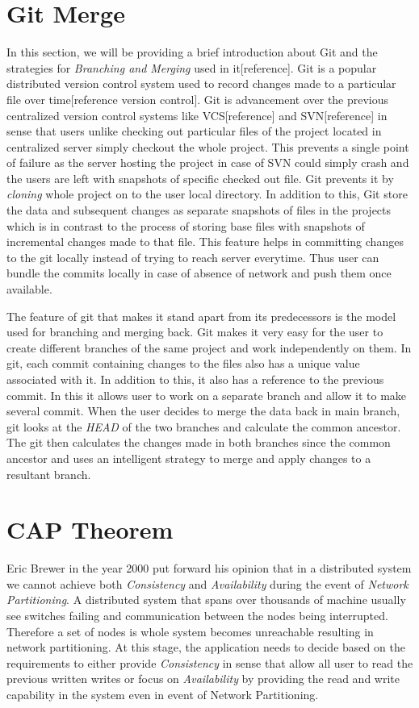 \documentclass[12pt,a4paper,twoside,openright]{book}
\begin{document}
\section{Git Merge}
In this section, we will be providing a brief introduction about Git and the strategies for \textit{Branching and Merging} used in it[reference]. Git is a popular distributed version control system used to record changes made to a particular file over time[reference version control]. Git is advancement over the previous centralized version control systems like VCS[reference] and SVN[reference] in sense that users unlike checking out particular files of the project located in centralized server simply checkout the whole project. This prevents a single point of failure as the server hosting the project in case of SVN could simply crash and the users are left with snapshots of specific checked out file. Git prevents it by \textit{cloning} whole project on to the user local directory. In addition to this, Git store the data and subsequent changes as separate snapshots of files in the projects which is in contrast to the process of storing base files with snapshots of incremental changes made to that file. This feature helps in committing changes to the git locally instead of trying to reach server everytime. Thus user can bundle the commits locally in case of absence of network and push them once available.
\par The feature of git that makes it stand apart from its predecessors is the model used for branching and merging back. Git makes it very easy for the user to create different branches of the same project and work independently on them. In git, each commit containing changes to the files also has a unique value associated with it. In addition to this, it also has a reference to the previous commit. In this it allows user to work on a separate branch and allow it to make several commit. When the user decides to merge the data back in main branch, git looks at the \textit{HEAD} of the two branches and calculate the common ancestor. The git then calculates the changes made in both branches since the common ancestor and uses an intelligent strategy to merge and apply changes to a resultant branch. 


\section{CAP Theorem}
Eric Brewer in the year 2000 put forward his opinion that in a distributed system we cannot achieve both \textit{Consistency} and \textit{Availability} during the event of \textit{Network Partitioning}. A distributed system that spans over thousands of machine usually see switches failing and communication between the nodes being interrupted. Therefore a set of nodes is whole system becomes unreachable resulting in network partitioning. At this stage, the application needs to decide based on the requirements to either provide \textit{Consistency} in sense that allow all user to read the previous written writes or focus on \textit{Availability} by providing the read and write capability in the system even in event of Network Partitioning.
\end{document}
